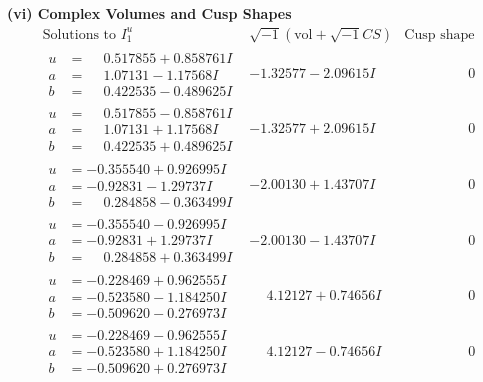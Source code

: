 \documentclass[1p]{elsarticle_modified}
\theoremstyle{definition}
\newcommand{\I}{\sqrt{-1}}
\begin{document}
\newpage\flushleft \textbf{(vi) Complex Volumes and Cusp Shapes}
$$\begin{array}{c|c|c}  
\text{Solutions to }I^u_{1}& \I (\text{vol} + \sqrt{-1}CS) & \text{Cusp shape}\\
 \hline 
\begin{aligned}
u &= \phantom{-}0.517855 + 0.858761 I \\
a &= \phantom{-}1.07131 - 1.17568 I \\
b &= \phantom{-}0.422535 - 0.489625 I\end{aligned}
 & -1.32577 - 2.09615 I & \phantom{-0.000000 } 0 \\ \hline\begin{aligned}
u &= \phantom{-}0.517855 - 0.858761 I \\
a &= \phantom{-}1.07131 + 1.17568 I \\
b &= \phantom{-}0.422535 + 0.489625 I\end{aligned}
 & -1.32577 + 2.09615 I & \phantom{-0.000000 } 0 \\ \hline\begin{aligned}
u &= -0.355540 + 0.926995 I \\
a &= -0.92831 - 1.29737 I \\
b &= \phantom{-}0.284858 - 0.363499 I\end{aligned}
 & -2.00130 + 1.43707 I & \phantom{-0.000000 } 0 \\ \hline\begin{aligned}
u &= -0.355540 - 0.926995 I \\
a &= -0.92831 + 1.29737 I \\
b &= \phantom{-}0.284858 + 0.363499 I\end{aligned}
 & -2.00130 - 1.43707 I & \phantom{-0.000000 } 0 \\ \hline\begin{aligned}
u &= -0.228469 + 0.962555 I \\
a &= -0.523580 - 1.184250 I \\
b &= -0.509620 - 0.276973 I\end{aligned}
 & \phantom{-}4.12127 + 0.74656 I & \phantom{-0.000000 } 0 \\ \hline\begin{aligned}
u &= -0.228469 - 0.962555 I \\
a &= -0.523580 + 1.184250 I \\
b &= -0.509620 + 0.276973 I\end{aligned}
 & \phantom{-}4.12127 - 0.74656 I & \phantom{-0.000000 } 0 \\ \hline\begin{aligned}

\end{aligned}
\end{array}$$
\end{document}
